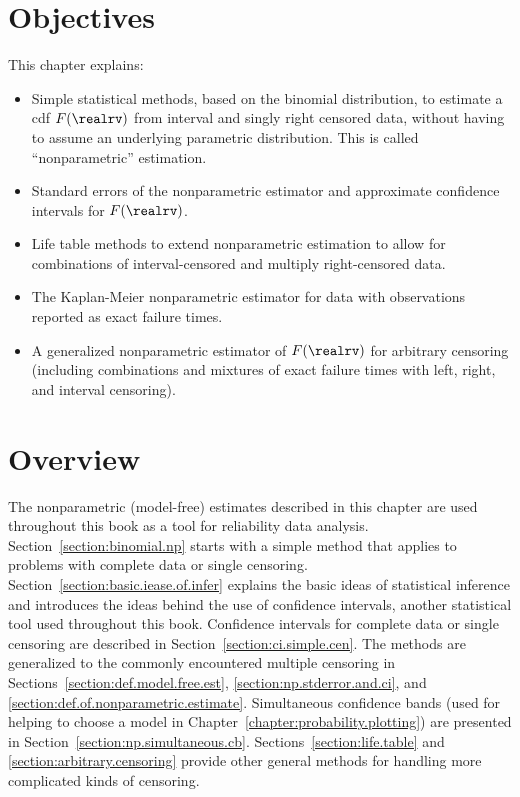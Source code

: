 \section*{Objectives}
This chapter explains:
\begin{itemize} 
\item 
Simple statistical methods, based on the binomial distribution, to
estimate a cdf $F(\realrv)$ from interval and singly right censored data,
without having to assume an underlying parametric distribution. This
is called ``nonparametric'' estimation.
\item 
Standard errors of the nonparametric estimator and approximate
confidence intervals for $F(\realrv)$.
\item 
Life table methods to extend nonparametric estimation to allow for
combinations of interval-censored and multiply right-censored data.
\item
The Kaplan-Meier nonparametric estimator for data with observations
reported as exact failure times.
\item 
A generalized nonparametric estimator of $F(\realrv)$ for arbitrary
censoring (including combinations and mixtures of exact failure times
with left, right, and interval censoring).
\end{itemize}

\section*{Overview}
The nonparametric (model-free) estimates described in this chapter are
used throughout this book as a tool for reliability data analysis.
Section~\ref{section:binomial.np} starts with a simple method that
applies to problems with complete data or single censoring.
Section~\ref{section:basic.iease.of.infer} explains the basic ideas
of statistical inference and introduces the ideas behind the use of
confidence intervals, another statistical tool used throughout this
book.  Confidence intervals for complete data or single censoring
are described in Section~\ref{section:ci.simple.cen}. The
methods are generalized to the commonly encountered multiple censoring
in Sections~\ref{section:def.model.free.est},
\ref{section:np.stderror.and.ci}, and
\ref{section:def.of.nonparametric.estimate}. Simultaneous
confidence bands (used for helping to choose a model in
Chapter~\ref{chapter:probability.plotting}) are presented in
Section~\ref{section:np.simultaneous.cb}.
Sections~\ref{section:life.table} and
\ref{section:arbitrary.censoring}
provide other general methods for handling more complicated kinds of censoring.



